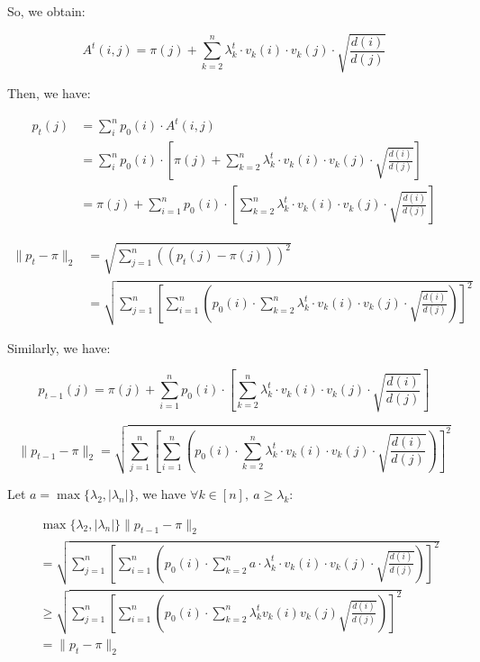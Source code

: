 \begin{enumerate}
  So, we obtain:

  \begin{equation}
      A^t(i,j)=\pi(j)+\sum_{k=2}^n \lambda_k^t \cdot v_k(i) \cdot v_k(j) \cdot \sqrt{\frac{d(i)}{d(j)}}
  \end{equation}
  
  Then, we have:

  \begin{equation}
      \begin{aligned}
          p_t(j)&=\sum_i^n p_0(i) \cdot A^t(i,j)\\
          &= \sum_i^n p_0(i) \cdot \left[\pi(j)+\sum_{k=2}^n \lambda_k^t \cdot v_k(i) \cdot v_k(j) \cdot \sqrt{\frac{d(i)}{d(j)}} \right]\\
          &= \pi(j) + \sum_{i=1}^n p_0(i) \cdot \left[\sum_{k=2}^n \lambda_k^t \cdot v_k(i) \cdot v_k(j) \cdot \sqrt{\frac{d(i)}{d(j)}} \right]
      \end{aligned}
  \end{equation}
  
  \begin{equation}
      \begin{aligned}
          \|p_t-\pi\|_2 &=\sqrt{\sum_{j=1}^n((p_t(j)-\pi(j)))^2}\\
          &= \sqrt{\sum_{j=1}^n \left[ \sum_{i=1}^n \left(p_0(i) \cdot \sum_{k=2}^n \lambda_k^t \cdot v_k(i) \cdot v_k(j) \cdot \sqrt{\frac{d(i)}{d(j)}}\right) \right]^2}
      \end{aligned}
  \end{equation}

  Similarly, we have:
  
  \begin{equation}
      p_{t-1}(j) = \pi(j) + \sum_{i=1}^n p_0(i) \cdot \left[\sum_{k=2}^n \lambda_k^t \cdot v_k(i) \cdot v_k(j) \cdot \sqrt{\frac{d(i)}{d(j)}} \right]
  \end{equation}
  
  \begin{equation}
      \|p_{t-1}-\pi\|_2 = \sqrt{\sum_{j=1}^n \left[ \sum_{i=1}^n \left(p_0(i) \cdot \sum_{k=2}^n
      \lambda_k^t \cdot v_k(i) \cdot v_k(j) \cdot \sqrt{\frac{d(i)}{d(j)}}\right) \right]^2}
  \end{equation}
  
  Let $a=\max\{\lambda_2, |\lambda_n|\}$, we have $\forall k \in [n],\  a\geq \lambda_k$: 
  
  \begin{equation}
      \begin{aligned}
          &\max\{\lambda_2, |\lambda_n|\} \|p_{t-1}-\pi\|_2 \\
          &= \sqrt{\sum_{j=1}^n \left[ \sum_{i=1}^n \left(p_0(i) \cdot \sum_{k=2}^n a\cdot \lambda_k^t \cdot v_k(i) \cdot v_k(j) \cdot \sqrt{\frac{d(i)}{d(j)}}\right) \right]^2}\\
          &\geq \sqrt{\sum_{j=1}^n \left[ \sum_{i=1}^n \left(p_0(i) \cdot \sum_{k=2}^n \lambda_k^{t} v_k(i) v_k(j) \sqrt{\frac{d(i)}{d(j)}}\right) \right]^2}\\
          &= \|p_{t}-\pi\|_2
      \end{aligned}
  \end{equation}



\end{enumerate}
